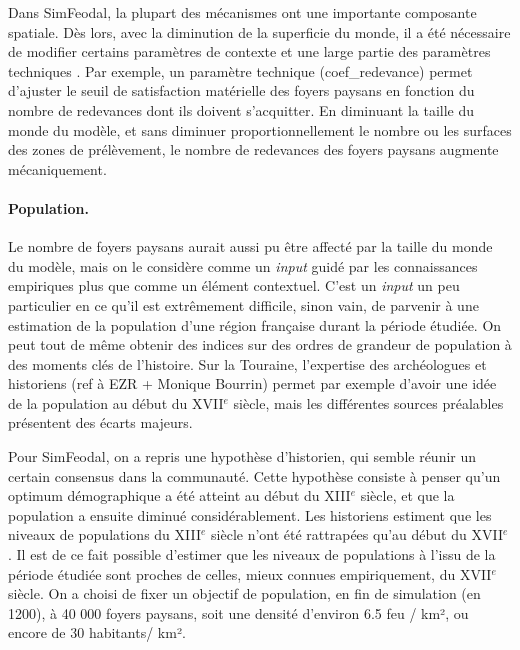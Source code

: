 Dans SimFeodal, la plupart des mécanismes ont une importante composante spatiale.
Dès lors, avec la diminution de la superficie du monde, il a été nécessaire de modifier certains paramètres de contexte et une large partie des paramètres techniques .
Par exemple, un paramètre technique (\textsf{coef\_redevance}) permet d'ajuster le seuil de satisfaction matérielle des foyers paysans en fonction du nombre de redevances dont ils doivent s'acquitter.
En diminuant la taille du monde du modèle, et sans diminuer proportionnellement le nombre ou les surfaces des zones de prélèvement, le nombre de redevances des foyers paysans augmente mécaniquement.

\paragraph{Population.}
Le nombre de foyers paysans aurait aussi pu être affecté par la taille du monde du modèle, mais on le considère comme un \textit{input} guidé par les connaissances empiriques plus que comme un élément contextuel.
C'est un \textit{input} un peu particulier en ce qu'il est extrêmement difficile, sinon vain, de parvenir à une estimation de la population d'une région française durant la période étudiée.
On peut tout de même obtenir des indices sur des ordres de grandeur de population à des moments clés de l'histoire.
Sur la Touraine, l'expertise des archéologues et historiens (ref à EZR + Monique Bourrin) permet par exemple d'avoir une idée de la population au début du XVII$^e$ siècle, mais les différentes sources préalables présentent des écarts majeurs.

Pour SimFeodal, on a repris une hypothèse d'historien, qui semble réunir un certain consensus dans la communauté.
Cette hypothèse consiste à penser qu'un optimum démographique a été atteint au début du XIII$^e$ siècle, et que la population a ensuite diminué considérablement.
Les historiens estiment que les niveaux de populations du XIII$^e$ siècle n'ont été rattrapées qu'au début du XVII$^e$.
Il est de ce fait possible d'estimer que les niveaux de populations à l'issu de la période étudiée sont proches de celles, mieux connues empiriquement, du XVII$^e$ siècle.
On a choisi de fixer un objectif de population, en fin de simulation (en 1200), à 40 000 foyers paysans, soit une densité d'environ 6.5 feu / km², ou encore de 30 habitants/ km².


